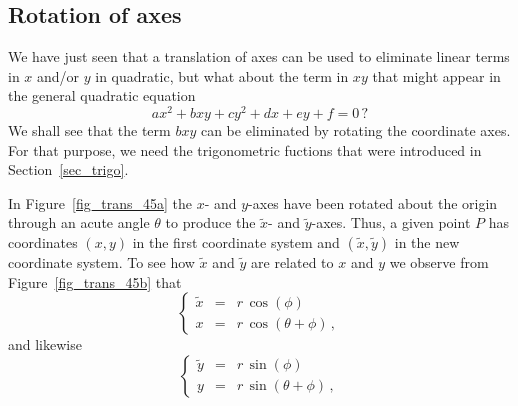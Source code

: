 \subsection{Rotation of axes}
\ifcourse
	\checkoddpage
{}
 \fi
We have just seen that a translation of axes can be used to eliminate linear terms in $x$ and/or $y$ in quadratic, but what about the term in $xy$ that might appear in the general quadratic equation
\begin{equation}
ax^2+bxy+cy^2+dx+ey+f=0\,?
\label{rot1}
\end{equation}
We shall see that the term $bxy$ can be eliminated by rotating the coordinate axes. For that purpose, we need the trigonometric fuctions that were introduced in Section~\ref{sec_trigo}. 

In Figure~\ref{fig_trans_45a} the  $x$-  and $y$-axes have been rotated about the origin through an acute angle $\theta$ to produce the $\widetilde{x}$- and $\widetilde{y}$-axes. Thus, a given point $P$  has coordinates $(x,y)$ in the first coordinate system and $(\widetilde{x},\widetilde{y})$ in the new coordinate system. To see how  $\widetilde{x}$   and $\widetilde{y}$ are related to $x$ and $y$ we observe from Figure~\ref{fig_trans_45b} that
$$
\left\{ 
\begin{array}{rcl}
\widetilde{x} & = & r\,\cos(\phi)\\[.2cm]
x & = & r\,\cos(\theta+\phi)\,, 
\end{array}\right.
$$
and likewise
$$
\left\{ 
\begin{array}{rcl}
\widetilde{y} & = & r\,\sin(\phi)\\[.2cm]
y & = & r\,\sin(\theta+\phi)\,, 
\end{array}\right.
$$


